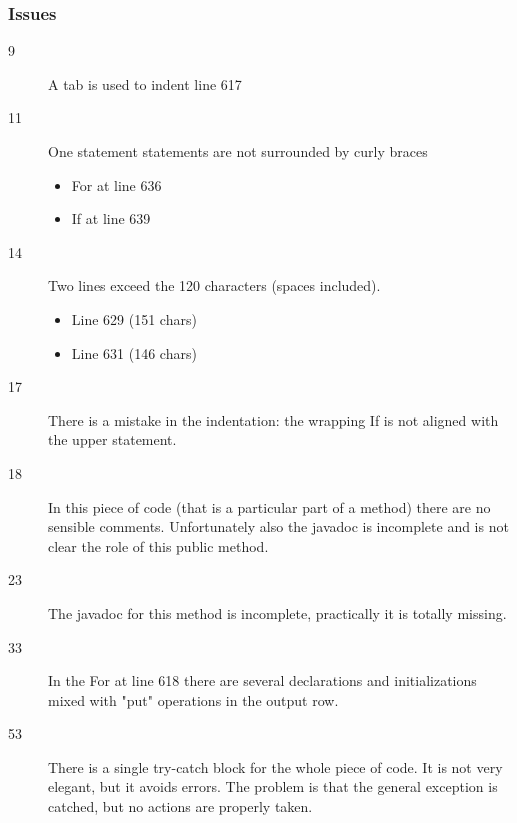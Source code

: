 		\subsubsection{Issues}
		\begin{description}
			\item[9] A tab is used to indent line 617
			\item[11] One statement statements are not surrounded by curly braces
			\begin{itemize}
				\item For at line 636
				\item If at line 639
			\end{itemize}
			\item[14] Two lines exceed the 120 characters (spaces included).
			\begin{itemize}
				\item Line 629 (151 chars)
				\item Line 631 (146 chars)
			\end{itemize}
			\item[17] There is a mistake in the indentation: the wrapping If is not aligned with the upper statement.
			\item[18] In this piece of code (that is a particular part of a method) there are no sensible comments.
			Unfortunately also the javadoc is incomplete and is not clear the role of this public method.
			\item[23] The javadoc for this method is incomplete, practically it is totally missing.
			\item[33] In the For at line 618 there are several declarations and initializations mixed with "put"
			operations in the output row.
			\item[53] There is a single try-catch block for the whole piece of code. It is not very elegant, but
			it avoids errors. The problem is that the general exception is catched, but no actions are properly taken.
		\end{description}